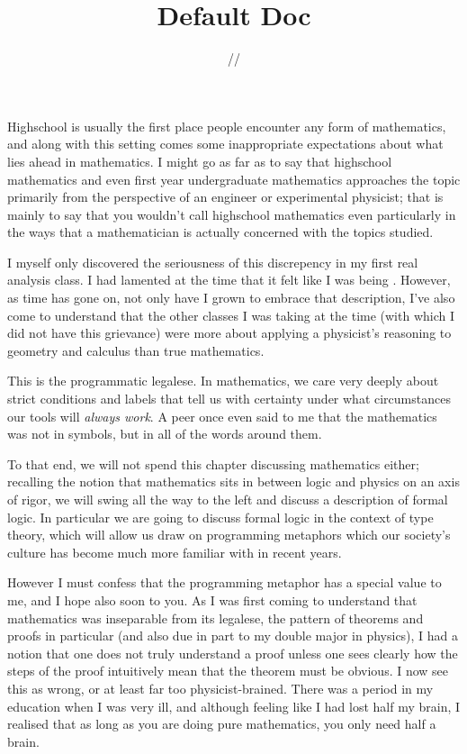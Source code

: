 \documentclass[11pt]{article}
\title{\textbf{Default Doc}}
\date{\the\day/\the\month/\the\year}
\begin{document}
Highschool is usually the first place people encounter any form of mathematics, and along with this setting comes some inappropriate expectations about what lies ahead in mathematics. I might go as far as to say that highschool mathematics and even first year undergraduate mathematics approaches the topic primarily from the perspective of an engineer or experimental physicist; that is mainly to say that you wouldn't call highschool mathematics even particularly  in the ways that a mathematician is actually concerned with the topics studied.

I myself only discovered the seriousness of this discrepency in my first real analysis class. I had lamented at the time that it felt like I was being . However, as time has gone on, not only have I grown to embrace that description, I've also come to understand that the other classes I was taking at the time (with which I did not have this grievance) were more about applying a physicist's reasoning to geometry and calculus than true mathematics.

This  is the programmatic legalese. In mathematics, we care very deeply about strict conditions and labels that tell us with certainty under what circumstances our tools will \emph{always work}. A peer once even said to me that the mathematics was not in symbols, but in all of the words around them.

To that end, we will not spend this chapter discussing mathematics either; recalling the notion that mathematics sits in between logic and physics on an axis of rigor, we will swing all the way to the left and discuss a description of formal logic. In particular we are going to discuss formal logic in the context of type theory, which will allow us draw on programming metaphors which our society's culture has become much more familiar with in recent years.

However I must confess that the programming metaphor has a special value to me, and I hope also soon to you. As I was first coming to understand that mathematics was inseparable from its legalese, the pattern of theorems and proofs in particular (and also due in part to my double major in physics), I had a notion that one does not truly understand a proof unless one sees clearly how the steps of the proof intuitively mean that the theorem must be obvious. I now see this as wrong, or at least far too physicist-brained. There was a period in my education when I was very ill, and although feeling like I had lost half my brain, I realised that as long as you are doing pure mathematics, you only need half a brain.
\end{document}
